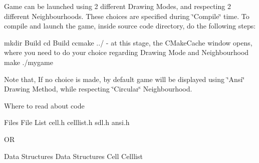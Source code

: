 
\begin{DoxyEnumerate}
\item Game can be launched using 2 different Drawing Modes, and respecting 2 different Neighbourhoods. These choices are specified during \char`\"{}\+Compile\char`\"{} time. To compile and launch the game, inside source code directory, do the following steps\+: \begin{DoxyVerb}mkdir Build
cd Build
ccmake ../ - at this stage, the CMakeCache window opens, where you need to do your
             choice regarding Drawing Mode and Neighbourhood
make
./mygame
\end{DoxyVerb}

\end{DoxyEnumerate}

Note that, If no choice is made, by default game will be displayed using \char`\"{}\+Ansi\char`\"{} Drawing Method, while respecting \char`\"{}\+Circular\char`\"{} Neighbourhood.


\begin{DoxyEnumerate}
\item Where to read about code \begin{DoxyVerb} Files 
     File List
         cell.h
         celllist.h
         sdl.h
         ansi.h
\end{DoxyVerb}


OR \begin{DoxyVerb}Data Structures
    Data Structures
        Cell
        Celllist
\end{DoxyVerb}
 
\end{DoxyEnumerate}